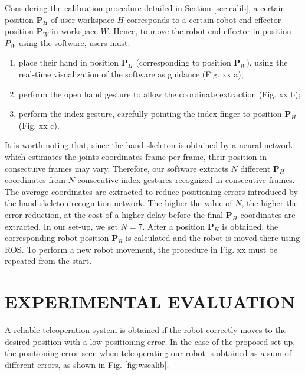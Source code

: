 \documentclass[a4paper, 10pt, conference]{ieeeconf}      %
\begin{document}
Considering the calibration procedure detailed in Section \ref{sec:calib}, a certain position $\mathbf{P}_{H}$ of user workspace $H$ corresponds to a certain robot end-effector position $\mathbf{P}_{W}$ in workspace $W$. Hence, to move the robot end-effector in position $P_W$  using the software, users must: %
\begin{enumerate}
\item place their hand in position $\mathbf{P}_H$ (corresponding to position $\mathbf{P}_W$), using the real-time visualization of the software as guidance (Fig. xx a);
\item perform the open hand gesture to allow the coordinate extraction (Fig. xx b);
\item perform the index gesture, carefully pointing the index finger to position $\mathbf{P}_H$ (Fig. xx c).
\end{enumerate}

It is worth noting that, since the hand skeleton is obtained by a neural network which estimates the joints coordinates frame per frame, their position in consectuive frames may vary. Therefore, our software extracts $N$ different $\mathbf{P}_H$ coordinates from $N$ consecutive index gestures recognized in consecutive frames. The average coordinates are extracted to reduce positioning errors introduced by the hand skeleton recognition network. The higher the value of $N$, the higher the error reduction, at the cost of a higher delay before the final $\mathbf{P}_H$ coordinates are extracted. In our set-up, we set $N = 7$.
After a position $\mathbf{P}_H$ is obtained, the corresponding robot position $\mathbf{P}_R$ is calculated and the robot is moved there using ROS.
To perform a new robot movement, the procedure in Fig. xx must be repeated from the start. %

\section{EXPERIMENTAL EVALUATION}\label{sec:experiments}
A reliable teleoperation system is obtained if the robot correctly moves to the desired position with a low positioning error. In the case of the proposed set-up, the positioning error seen when teleoperating our robot is obtained as a sum of different errors, as shown in Fig. \ref{fig:wscalib}.
\end{document}
